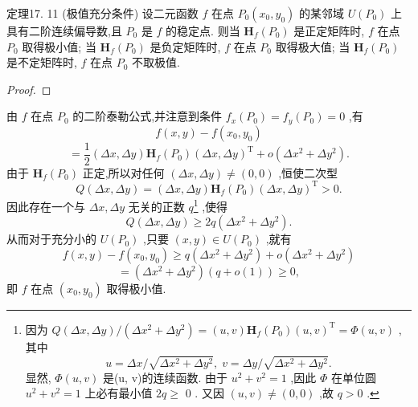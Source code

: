 定理17. 11 (极值充分条件) 设二元函数 \(f\) 在点 \({P}_{0}\left( {{x}_{0},{y}_{0}}\right)\) 的某邻域 \(U\left( {P}_{0}\right)\) 上具有二阶连续偏导数,且 \({P}_{0}\) 是 \(f\) 的稳定点. 则当 \({\mathbf{H}}_{f}\left( {P}_{0}\right)\) 是正定矩阵时, \(f\) 在点 \({P}_{0}\) 取得极小值; 当 \({\mathbf{H}}_{f}\left( {P}_{0}\right)\) 是负定矩阵时, \(f\) 在点 \({P}_{0}\) 取得极大值; 当 \({\mathbf{H}}_{f}\left( {P}_{0}\right)\) 是不定矩阵时, \(f\) 在点 \({P}_{0}\) 不取极值.

\begin{proof}

\end{proof}
由 \(f\) 在点 \({P}_{0}\) 的二阶泰勒公式,并注意到条件 \({f}_{x}\left( {P}_{0}\right)  = {f}_{y}\left( {P}_{0}\right)  = 0\) ,有
\[
f\left( {x,y}\right)  - f\left( {{x}_{0},{y}_{0}}\right)
\]
\[
= \frac{1}{2}\left( {{\Delta x},{\Delta y}}\right) {\mathbf{H}}_{f}\left( {P}_{0}\right) {\left( \Delta x,\Delta y\right) }^{\mathrm{T}} + o\left( {\Delta {x}^{2} + \Delta {y}^{2}}\right) .
\]
由于 \({\mathbf{H}}_{f}\left( {P}_{0}\right)\) 正定,所以对任何 \(\left( {{\Delta x},{\Delta y}}\right)  \neq  \left( {0,0}\right)\) ,恒使二次型
\[
Q\left( {{\Delta x},{\Delta y}}\right)  = \left( {{\Delta x},{\Delta y}}\right) {\mathbf{H}}_{f}\left( {P}_{0}\right) {\left( \Delta x,\Delta y\right) }^{\mathrm{T}} > 0.
\]
因此存在一个与 \({\Delta x},{\Delta y}\) 无关的正数 \({q}\)\footnote{因为 \(Q\left( {{\Delta x},{\Delta y}}\right) /\left( {\Delta {x}^{2} + \Delta {y}^{2}}\right)  = \left( {u,v}\right) {\mathbf{H}}_{f}\left( {P}_{0}\right) {\left( u,v\right) }^{\mathrm{T}} = \Phi \left( {u,v}\right)\) ,其中
\[
u = {\Delta x}/\sqrt{\Delta {x}^{2} + \Delta {y}^{2}},\;v = {\Delta y}/\sqrt{\Delta {x}^{2} + \Delta {y}^{2}}.
\]
显然, \(\Phi \left( {u,v}\right)\) 是(u, v)的连续函数. 由于 \({u}^{2} + {v}^{2} = 1\) ,因此 \(\Phi\) 在单位圆 \({u}^{2} + {v}^{2} = 1\) 上必有最小值 \({2q} \geq\) 0 . 又因 \(\left( {u,v}\right)  \neq  \left( {0,0}\right)\) ,故 \(q > 0\) .} ,使得
\[
Q\left( {{\Delta x},{\Delta y}}\right)  \geq  {2q}\left( {\Delta {x}^{2} + \Delta {y}^{2}}\right) .
\]
从而对于充分小的 \(U\left( {P}_{0}\right)\) ,只要 \(\left( {x,y}\right)  \in  U\left( {P}_{0}\right)\) ,就有
\[
f\left( {x,y}\right)  - f\left( {{x}_{0},{y}_{0}}\right)  \geq  q\left( {\Delta {x}^{2} + \Delta {y}^{2}}\right)  + o\left( {\Delta {x}^{2} + \Delta {y}^{2}}\right)
\]
\[
= \left( {\Delta {x}^{2} + \Delta {y}^{2}}\right) \left( {q + o\left( 1\right) }\right)  \geq  0,
\]
即 \(f\) 在点 \(\left( {{x}_{0},{y}_{0}}\right)\) 取得极小值.

